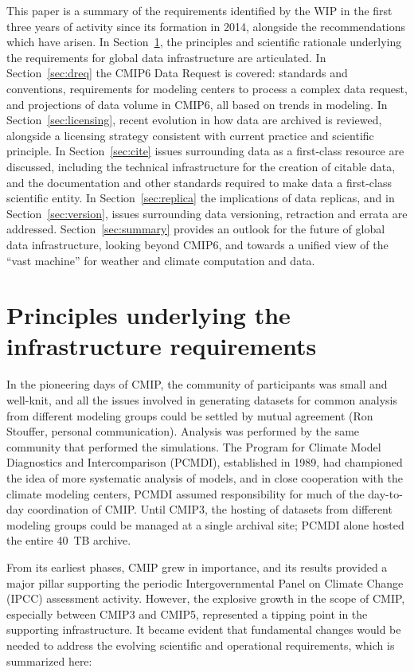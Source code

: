 \documentclass[gmd,manuscript]{copernicus}
\newcommand{\secref}[1] {\mbox{Section  \ref{sec:#1}}}
\begin{document}
This paper is a summary of the requirements identified by the WIP in
the first three years of activity since its formation in 2014,
alongside the recommendations which have arisen. In
\secref{principles}, the principles and scientific rationale
underlying the requirements for global data infrastructure are
articulated. In \secref{dreq} the CMIP6 Data Request is covered:
standards and conventions, requirements for modeling centers to
process a complex data request, and projections of data volume in
CMIP6, all based on trends in modeling. In \secref{licensing}, recent
evolution in how data are archived is reviewed, alongside a licensing
strategy consistent with current practice and scientific principle. In
\secref{cite} issues surrounding data as a first-class resource are
discussed, including the technical infrastructure for the creation of
citable data, and the documentation and other standards required to
make data a first-class scientific entity. In \secref{replica} the
implications of data replicas, and in \secref{version}, issues
surrounding data versioning, retraction and errata are addressed.
\secref{summary} provides an outlook for the future of global data
infrastructure, looking beyond CMIP6, and towards a unified view of
the ``vast machine'' for weather and climate computation and data.

\section{Principles underlying the infrastructure requirements}
\label{sec:principles}

In the pioneering days of CMIP, the community of participants was
small and well-knit, and all the issues involved in generating
datasets for common analysis from different modeling groups could be
settled by mutual agreement (Ron Stouffer, personal communication).
Analysis was performed by the same community that performed the
simulations. The Program for Climate Model Diagnostics and
Intercomparison (PCMDI), established in 1989, had championed the idea
of more systematic analysis of models, and in close cooperation with
the climate modeling centers, PCMDI assumed responsibility for
much of the day-to-day coordination of CMIP. Until CMIP3, the hosting
of datasets from different modeling groups could be managed at a
single archival site; PCMDI alone hosted the entire 40~TB archive.

From its earliest phases, CMIP grew in importance, and its results
provided a major pillar supporting the periodic Intergovernmental
Panel on Climate Change (IPCC) assessment activity. However, the
explosive growth in the scope of CMIP, especially between CMIP3 and
CMIP5, represented a tipping point in the supporting infrastructure. 
It became evident that fundamental changes would be needed to address 
the evolving scientific and operational requirements, which is summarized
here:
\end{document}
